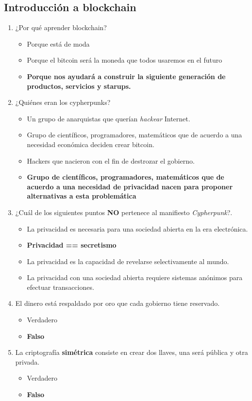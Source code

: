 \documentclass[a4paper,12pt]{lib/pub}
\begin{document}
\subsection{Introducción a blockchain}
\begin{enumerate}
	\item ¿Por qué aprender blockchain?
	\begin{itemize}
		\item Porque está de moda
		\item Porque el bitcoin será la moneda que todos usaremos en el futuro
		\item \textbf{Porque nos ayudará a construir la siguiente generación de productos, servicios y starups.}
	\end{itemize}
	\item ¿Quiénes eran los cypherpunks?
	\begin{itemize}
		\item Un grupo de anarquistas que querían \textit{hackear} Internet.
		\item Grupo de científicos, programadores, matemáticos que de acuerdo a una necesidad económica deciden crear bitcoin.
		\item Hackers que nacieron con el fin de destrozar el gobierno.
		\item \textbf{Grupo de científicos, programadores, matemáticos que de acuerdo a una necesidad de privacidad nacen para proponer alternativas a esta problemática}
	\end{itemize}
	\item ¿Cuál de los siguientes puntos \textbf{NO} pertenece al manifiesto \textit{Cypherpunk}?.
	\begin{itemize}
		\item La privacidad es necesaria para una sociedad abierta en la era electrónica.
		\item \textbf{Privacidad == secretismo}
		\item La privacidad es la capacidad de revelarse selectivamente al mundo.
		\item La privacidad con una sociedad abierta requiere sistemas anónimos para efectuar transacciones.
	\end{itemize}
	\item El dinero está respaldado por oro que cada gobierno tiene reservado.
	\begin{itemize}
		\item Verdadero
		\item \textbf{Falso}
	\end{itemize}
	\item La criptografía \textbf{simétrica} consiste en crear dos llaves, una será pública y otra privada.
	\begin{itemize}
		\item Verdadero
		\item \textbf{Falso}
	\end{itemize}
\end{enumerate}
\end{document}
